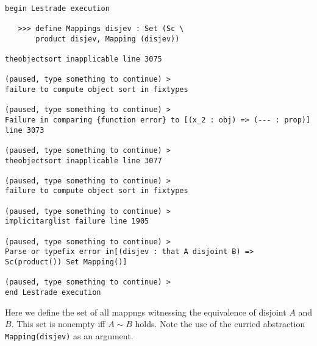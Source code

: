 \documentclass[12pt]{article}
\begin{document}
\begin{verbatim}

begin Lestrade execution

   >>> define Mappings disjev : Set (Sc \
       product disjev, Mapping (disjev))

theobjectsort inapplicable line 3075

(paused, type something to continue) >
failure to compute object sort in fixtypes

(paused, type something to continue) >
Failure in comparing {function error} to [(x_2 : obj) => (--- : prop)] line 3073

(paused, type something to continue) >
theobjectsort inapplicable line 3077

(paused, type something to continue) >
failure to compute object sort in fixtypes

(paused, type something to continue) >
implicitarglist failure line 1905

(paused, type something to continue) >
Parse or typefix error in[(disjev : that A disjoint B) => Sc(product()) Set Mapping()]

(paused, type something to continue) >
end Lestrade execution
\end{verbatim}

Here we define the set of all mappngs witnessing the equivalence of disjoint $A$ and $B$.  This set is nonempty iff $A \sim B$ holds.  Note the use of the curried abstraction
{\tt Mapping(disjev)} as an argument.
\end{document}
